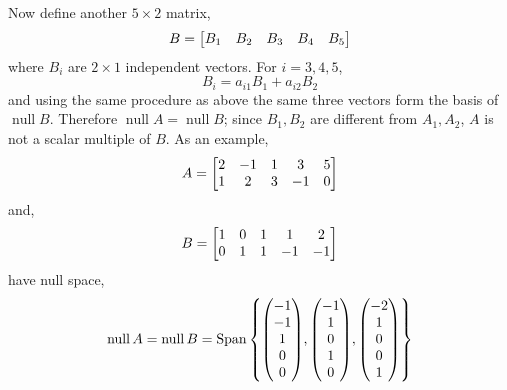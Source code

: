\documentclass[11pt,a4paper]{scrartcl}
\DeclareMathOperator{\nspace}{null}
\DeclareMathOperator{\Span}{Span}
\newcommand{\lmap}[2]{\mathcal{L}(#1,#2)}
\newcounter{problem}
\begin{document}
\begin{problem}[3.B.31]
{    Now define another $5 \times 2$ matrix,
    \[
    B = \mqty[ B_1 & B_2 & B_3 & B_4 & B_5 ]
    \]  
    where $B_i$ are $2 \times 1$ independent vectors. For $i=3,4,5$,
    \[
    B_i = a_{i1} B_1 + a_{i2} B_2 
    \]  
    and using the same procedure as above the same three vectors
    form the basis of $\nspace B$. Therefore $\nspace A = \nspace B$;
    since $B_1,B_2$ are different from $A_1,A_2$, $A$ is not a scalar multiple of $B$. As an example,
    \[
    A =
    \mqty[
    2 &  -1 &  1  &  3   &  5 \\
    1 &  2  &  3  &  -1  &  0
    ]
    \]
    and,
    \[
    B =
    \mqty[
    1 &  0 &  1  &  1   &  2 \\
    0 &  1 &  1  &  -1  &  -1
    ]    
    \]
    have null space,
    \[
    \nspace A = \nspace B = 
    \Span 
    \left\{
    \mqty(
    -1 \\
    -1 \\
    1 \\
    0 \\
    0
    ),
    \mqty(
    -1 \\
    1 \\
    0 \\
    1 \\
    0
    ),
    \mqty(
    -2 \\
    1 \\
    0 \\
    0 \\
    1
    )    
    \right\}
    \]
}
\end{problem}
\end{document}
